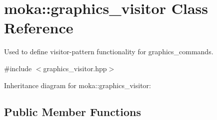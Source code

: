 \hypertarget{classmoka_1_1graphics__visitor}{}\section{moka\+::graphics\+\_\+visitor Class Reference}
\label{classmoka_1_1graphics__visitor}


Used to define visitor-\/pattern functionality for graphics\+\_\+commands.  




{\ttfamily \#include $<$graphics\+\_\+visitor.\+hpp$>$}



Inheritance diagram for moka\+::graphics\+\_\+visitor\+:
\subsection*{Public Member Functions}
